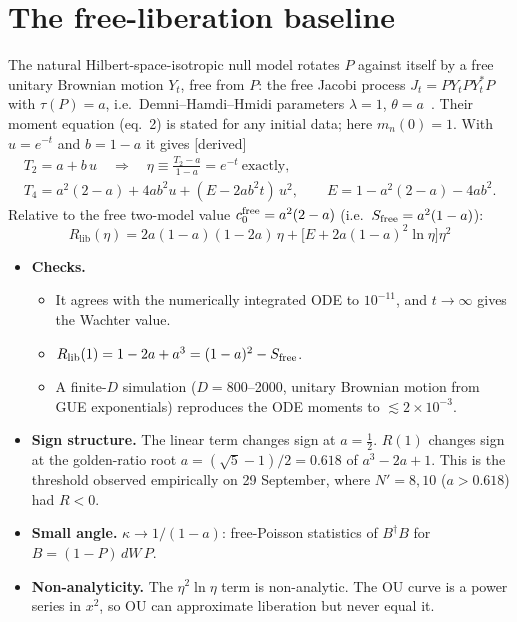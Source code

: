 \documentclass[11pt]{article}
\newcommand{\Np}{N'}
\newcommand{\lib}{\mathrm{lib}}
\newcommand{\tagbox}[2]{\textsf{\small\color{#1}[#2]}}
\newcommand{\DER}{\tagbox{cder}{derived}}
\theoremstyle{remark}
\begin{document}
\section{The free-liberation baseline}\label{sec:liberation}
The natural Hilbert-space-isotropic null model rotates $P$ against itself by a free unitary Brownian motion $Y_t$,
free from $P$: the free Jacobi process $J_t=PY_tPY_t^*P$ with $\tau(P)=a$, i.e.\ Demni--Hamdi--Hmidi parameters
$\lambda=1$, $\theta=a$~\cite{DHH}. Their moment equation (eq.~2) is stated for any initial data; here $m_n(0)=1$. With
$u=e^{-t}$ and $b=1-a$ it gives \DER
\begin{gather}
T_2=a+b\,u\quad\Rightarrow\quad\eta\equiv\frac{T_2-a}{1-a}=e^{-t}\ \text{exactly},\nonumber\\
T_4=a^2(2-a)+4ab^2u+(E-2ab^2t)\,u^2,\qquad E=1-a^2(2-a)-4ab^2 .
\end{gather}
Relative to the free two-model value $c_0^{\rm free}=a^2(2-a)$ (i.e.\ $S_{\rm free}=a^2(1-a)$):
\begin{equation}
\boxed{\;R_\lib(\eta)=2a(1-a)(1-2a)\,\eta+\big[E+2a(1-a)^2\ln\eta\big]\eta^2\;}
\end{equation}
\begin{itemize}\itemsep1pt
\item \textbf{Checks.}
  \begin{itemize}\itemsep1pt
  \item It agrees with the numerically integrated ODE to $10^{-11}$, and $t\to\infty$ gives the Wachter value.
  \item $R_\lib(1)=1-2a+a^3=(1-a)^2-S_{\rm free}$.
  \item A finite-$D$ simulation ($D=800$--2000, unitary Brownian motion from GUE exponentials) reproduces the ODE moments
    to $\lesssim2\times10^{-3}$.
  \end{itemize}
\item \textbf{Sign structure.} The linear term changes sign at $a=\tfrac12$. $R(1)$ changes sign at the golden-ratio root
  $a=(\sqrt5-1)/2=0.618$ of $a^3-2a+1$. This is the threshold observed empirically on 29 September, where $\Np=8,10$
  ($a>0.618$) had $R<0$.
\item \textbf{Small angle.} $\kappa\to1/(1-a)$: free-Poisson statistics of $B^\dagger B$ for $B=(1-P)\,dW\,P$.
\item \textbf{Non-analyticity.} The $\eta^2\ln\eta$ term is non-analytic. The OU curve is a power series in $x^2$, so OU
  can approximate liberation but never equal it.
\end{itemize}
\end{document}

